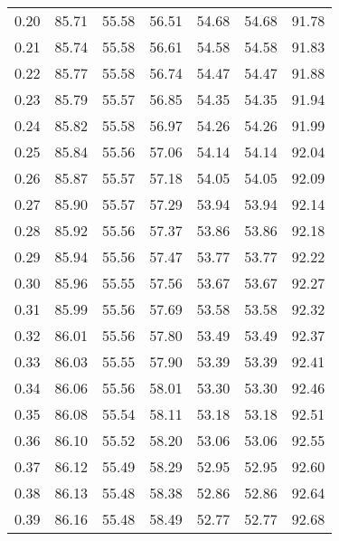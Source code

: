 \begin{tabular}{|c|c|c|c|c|c|c|}
      0.20 &     85.71 &     55.58 &      56.51 &   54.68 &      54.68 &         91.78 \\
      0.21 &     85.74 &     55.58 &      56.61 &   54.58 &      54.58 &         91.83 \\
      0.22 &     85.77 &     55.58 &      56.74 &   54.47 &      54.47 &         91.88 \\
      0.23 &     85.79 &     55.57 &      56.85 &   54.35 &      54.35 &         91.94 \\
      0.24 &     85.82 &     55.58 &      56.97 &   54.26 &      54.26 &         91.99 \\
      0.25 &     85.84 &     55.56 &      57.06 &   54.14 &      54.14 &         92.04 \\
      0.26 &     85.87 &     55.57 &      57.18 &   54.05 &      54.05 &         92.09 \\
      0.27 &     85.90 &     55.57 &      57.29 &   53.94 &      53.94 &         92.14 \\
      0.28 &     85.92 &     55.56 &      57.37 &   53.86 &      53.86 &         92.18 \\
      0.29 &     85.94 &     55.56 &      57.47 &   53.77 &      53.77 &         92.22 \\
      0.30 &     85.96 &     55.55 &      57.56 &   53.67 &      53.67 &         92.27 \\
      0.31 &     85.99 &     55.56 &      57.69 &   53.58 &      53.58 &         92.32 \\
      0.32 &     86.01 &     55.56 &      57.80 &   53.49 &      53.49 &         92.37 \\
      0.33 &     86.03 &     55.55 &      57.90 &   53.39 &      53.39 &         92.41 \\
      0.34 &     86.06 &     55.56 &      58.01 &   53.30 &      53.30 &         92.46 \\
      0.35 &     86.08 &     55.54 &      58.11 &   53.18 &      53.18 &         92.51 \\
      0.36 &     86.10 &     55.52 &      58.20 &   53.06 &      53.06 &         92.55 \\
      0.37 &     86.12 &     55.49 &      58.29 &   52.95 &      52.95 &         92.60 \\
      0.38 &     86.13 &     55.48 &      58.38 &   52.86 &      52.86 &         92.64 \\
      0.39 &     86.16 &     55.48 &      58.49 &   52.77 &      52.77 &         92.68 \\

\end{tabular}
